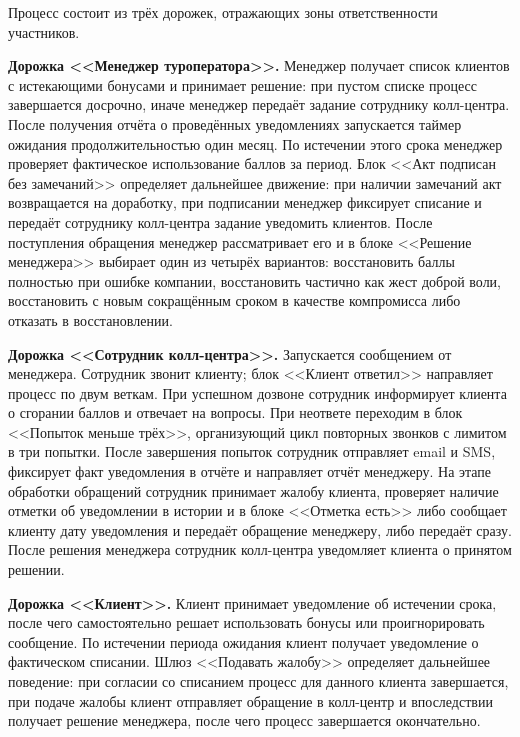 \documentclass[11pt,a4paper,final]{article}
\begin{document}
Процесс состоит из трёх дорожек, отражающих зоны ответственности участников.

\textbf{Дорожка <<Менеджер туроператора>>.} Менеджер получает список клиентов с истекающими бонусами и принимает решение: при пустом списке процесс завершается досрочно, иначе менеджер передаёт задание сотруднику колл-центра. После получения отчёта о проведённых уведомлениях запускается таймер ожидания продолжительностью один месяц. По истечении этого срока менеджер проверяет фактическое использование баллов за период. Блок <<Акт подписан без замечаний>> определяет дальнейшее движение: при наличии замечаний акт возвращается на доработку, при подписании менеджер фиксирует списание и передаёт сотруднику колл-центра задание уведомить клиентов. После поступления обращения менеджер рассматривает его и в блоке <<Решение менеджера>> выбирает один из четырёх вариантов: восстановить баллы полностью при ошибке компании, восстановить частично как жест доброй воли, восстановить с новым сокращённым сроком в качестве компромисса либо отказать в восстановлении.

\textbf{Дорожка <<Сотрудник колл-центра>>.} Запускается сообщением от менеджера. Сотрудник звонит клиенту; блок <<Клиент ответил>> направляет процесс по двум веткам. При успешном дозвоне сотрудник информирует клиента о сгорании баллов и отвечает на вопросы. При неответе переходим в блок <<Попыток меньше трёх>>, организующий цикл повторных звонков с лимитом в три попытки. После завершения попыток сотрудник отправляет email и SMS, фиксирует факт уведомления в отчёте и направляет отчёт менеджеру. На этапе обработки обращений сотрудник принимает жалобу клиента, проверяет наличие отметки об уведомлении в истории и в блоке <<Отметка есть>> либо сообщает клиенту дату уведомления и передаёт обращение менеджеру, либо передаёт сразу. После решения менеджера сотрудник колл-центра уведомляет клиента о принятом решении.

\textbf{Дорожка <<Клиент>>.} Клиент принимает уведомление об истечении срока, после чего самостоятельно решает использовать бонусы или проигнорировать сообщение. По истечении периода ожидания клиент получает уведомление о фактическом списании. Шлюз <<Подавать жалобу>> определяет дальнейшее поведение: при согласии со списанием процесс для данного клиента завершается, при подаче жалобы клиент отправляет обращение в колл-центр и впоследствии получает решение менеджера, после чего процесс завершается окончательно.
\end{document}
